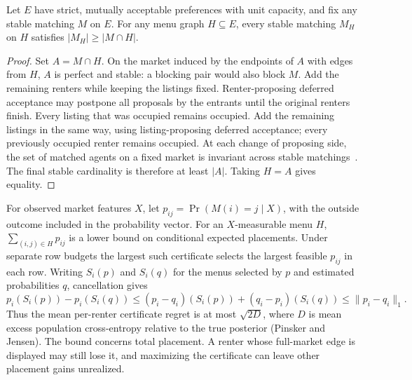 \begin{proposition}
Let $E$ have strict, mutually acceptable preferences with unit capacity, and fix any stable matching $M$ on $E$. For any menu graph $H\subseteq E$, every stable matching $M_H$ on $H$ satisfies $|M_H|\ge |M\cap H|$.
\end{proposition}
\begin{proof}
Set $A=M\cap H$. On the market induced by the endpoints of $A$ with edges from $H$, $A$ is perfect and stable: a blocking pair would also block $M$. Add the remaining renters while keeping the listings fixed. Renter-proposing deferred acceptance may postpone all proposals by the entrants until the original renters finish. Every listing that was occupied remains occupied. Add the remaining listings in the same way, using listing-proposing deferred acceptance; every previously occupied renter remains occupied. At each change of proposing side, the set of matched agents on a fixed market is invariant across stable matchings~\cite{galesoto,roth1986}. The final stable cardinality is therefore at least $|A|$. Taking $H=A$ gives equality.
\end{proof}

For observed market features $X$, let $p_{ij}=\Pr(M(i)=j\mid X)$, with the outside outcome included in the probability vector. For an $X$-measurable menu $H$, $\sum_{(i,j)\in H}p_{ij}$ is a lower bound on conditional expected placements. Under separate row budgets the largest such certificate selects the largest feasible $p_{ij}$ in each row. Writing $S_i(p)$ and $S_i(q)$ for the menus selected by $p$ and estimated probabilities $q$, cancellation gives
\[
 p_i(S_i(p))-p_i(S_i(q))\le (p_i-q_i)(S_i(p))+(q_i-p_i)(S_i(q))\le \lVert p_i-q_i\rVert_1.
\]
Thus the mean per-renter certificate regret is at most $\sqrt{2D}$, where $D$ is mean excess population cross-entropy relative to the true posterior (Pinsker and Jensen). The bound concerns total placement. A renter whose full-market edge is displayed may still lose it, and maximizing the certificate can leave other placement gains unrealized.
